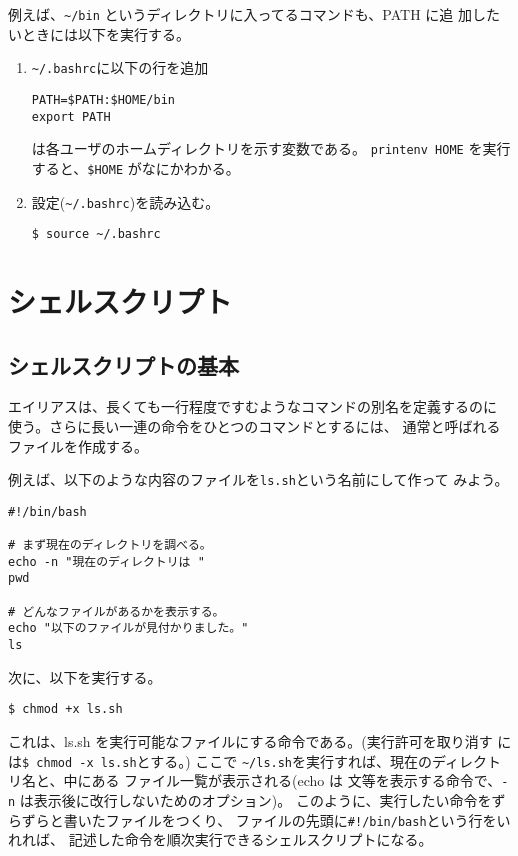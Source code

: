 \documentclass{jreport}
\begin{document}
例えば、\verb|~/bin| というディレクトリに入ってるコマンドも、PATH に追
加したいときには以下を実行する。
\begin{enumerate}
\item \verb|~/.bashrc|に以下の行を追加
  \begin{screen}
\begin{verbatim}
PATH=$PATH:$HOME/bin
export PATH
\end{verbatim}
  \end{screen}
  は各ユーザのホームディレクトリを示す変数である。
  \verb|printenv HOME| を実行すると、\verb|$HOME| がなにかわかる。
\item 設定(\verb|~/.bashrc|)を読み込む。
  \begin{screen}
\begin{verbatim}
$ source ~/.bashrc
\end{verbatim}
  \end{screen}
\end{enumerate}

\section{シェルスクリプト}

\subsection{シェルスクリプトの基本}

エイリアスは、長くても一行程度ですむようなコマンドの別名を定義するのに
使う。さらに長い一連の命令をひとつのコマンドとするには、
通常と呼ばれるファイルを作成する。

例えば、以下のような内容のファイルを\verb|ls.sh|という名前にして作って
みよう。
\begin{screen}
\begin{verbatim}
#!/bin/bash

# まず現在のディレクトリを調べる。
echo -n "現在のディレクトリは "
pwd

# どんなファイルがあるかを表示する。
echo "以下のファイルが見付かりました。"
ls
\end{verbatim}
\end{screen}
次に、以下を実行する。
\begin{screen}
\begin{verbatim}
$ chmod +x ls.sh
\end{verbatim}
\end{screen}
これは、ls.sh を実行可能なファイルにする命令である。(実行許可を取り消す
には\verb|$ chmod -x ls.sh|とする。)
ここで \verb|~/ls.sh|を実行すれば、現在のディレクトリ名と、中にある
ファイル一覧が表示される(echo は 文等を表示する命令で、\verb|-n| 
は表示後に改行しないためのオプション)。
このように、実行したい命令をずらずらと書いたファイルをつくり、
ファイルの先頭に\verb|#!/bin/bash|という行をいれれば、
記述した命令を順次実行できるシェルスクリプトになる。
\end{document}
